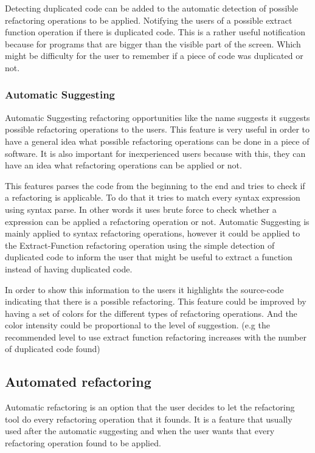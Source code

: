 Detecting duplicated code can be added to the automatic detection of possible refactoring operations to be applied.
Notifying the users of a possible extract function operation if there is duplicated code.
This is a rather useful notification because for programs that are bigger than the
visible part of the screen.
Which might be difficulty for the user to remember if a piece of code was duplicated or not.



\subsubsection{Automatic Suggesting}
Automatic Suggesting refactoring opportunities like the name suggests it suggests
possible refactoring operations to the users.
This feature is very useful in order to have a general idea what possible refactoring
operations can be done in a piece of software.
It is also important for inexperienced users because with this,
they can have an idea what refactoring operations can be applied or not.


This features parses the code from the beginning to the end and tries to check
if a refactoring is applicable.
To do that it tries to match every syntax expression using syntax parse.
In other words it uses brute force to check whether a expression can be applied
a refactoring operation or not.
Automatic Suggesting is mainly applied to syntax refactoring operations, however
it could be applied to the Extract-Function refactoring operation using the
simple detection of duplicated code to inform the user that might be useful
to extract a function instead of having duplicated code.

In order to show this information to the users it highlights the source-code indicating
that there is a possible refactoring.
This feature could be improved by having a set of colors for the different types
of refactoring operations. And the color intensity could be proportional to the level
of suggestion. (e.g the recommended level to use extract function refactoring
increases with the number of duplicated code found)


\subsection{Automated refactoring}
Automatic refactoring is an option that the user decides to let the refactoring
tool do every refactoring operation that it founds. It is a feature that usually used
after the automatic suggesting and when the user wants that every refactoring operation
found to be applied.

